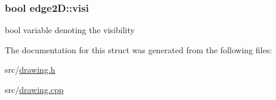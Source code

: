 \subsubsection[{\texorpdfstring{visi}{visi}}]{\setlength{\rightskip}{0pt plus 5cm}bool edge2\+D\+::visi}\hypertarget{structedge2_d_a140384dd970666607f730aece19be91e}{}\label{structedge2_d_a140384dd970666607f730aece19be91e}
bool variable denoting the visibility 

The documentation for this struct was generated from the following files\+:\begin{DoxyCompactItemize}
\item 
src/\hyperlink{drawing_8h}{drawing.\+h}\item 
src/\hyperlink{drawing_8cpp}{drawing.\+cpp}\end{DoxyCompactItemize}
